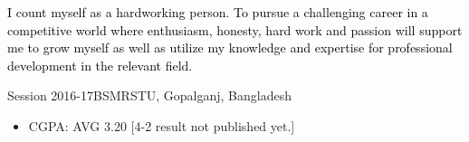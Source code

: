 \documentclass[10pt,a4paper,ragged2e,withhyper]{altacv}
\begin{document}
    \begin{paracol}{1}

        
 
\vspace{-18pt}
            \begin{itemize}
                \textcolor{black}{\small I count myself as a hardworking person. To pursue a challenging career in a competitive world
where enthusiasm, honesty, hard work and passion will support me to grow myself as well as
utilize my knowledge and expertise for professional development in the relevant field.}
            \end{itemize}

\vspace{-17pt}



             \vspace*{-\baselineskip}
           

\vspace{-14 pt}

 
 
        {\footnotesize Session 2016-17}{\footnotesize BSMRSTU, Gopalganj, Bangladesh}
        \begin{itemize}
                \item  \footnotesize CGPA:  AVG 3.20 [4-2 result not published
yet.]
            \end{itemize}
            



\end{paracol}
\end{document}
